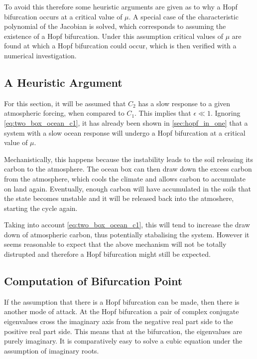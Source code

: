 To avoid this therefore some heuristic arguments are given as to why a Hopf bifurcation occurs at a critical value of $\mu$. A special case of the 
characteristic polynomial of the Jacobian is solved, which corresponds to assuming the existence of a Hopf bifurcation. Under this assumption 
critical values of $\mu$ are found at which a Hopf bifurcation could occur, which is then verified with a numerical investigation.

\subsection{A Heuristic Argument}
For this section, it will be assumed that $C_2$ has a slow response to a given atmospheric  forcing, when compared to $C_1$. This implies that $\epsilon \ll 1$.
Ignoring \cref{eq:two_box_ocean_c1}, it has already been shown in \cref{sec:hopf_in_one} that a system with a slow ocean response will undergo a Hopf bifurcation at a critical value of $\mu$.

Mechanistically, this happens because the instability leads to the soil releasing its carbon to the atmosphere. The ocean box can then draw down the excess carbon from the atmosphere, which cools
the climate and allows carbon to accumulate on land again. Eventually, enough carbon will have accumulated in the soils that the state becomes unstable and it will be released back into the atmoshere,
starting the cycle again.

Taking into account \cref{eq:two_box_ocean_c1}, this will tend to increase the draw down of atmospheric carbon, thus potentially stabalising the system. However it seems reasonable to expect that the above
mechanism will not be totally distrupted and therefore a Hopf bifurcation might still be expected.

\subsection{Computation of Bifurcation Point}
If the assumption that there is a Hopf bifurcation can be made, then there is another mode of attack. At the Hopf bifurcation a pair of complex conjugate eigenvalues
cross the imaginary axis from the negative real part side to the positive real part side. This means that at the bifurcation, the eigenvalues are purely imaginary. It is
comparatively easy to solve a cubic equation under the assumption of imaginary roots.

